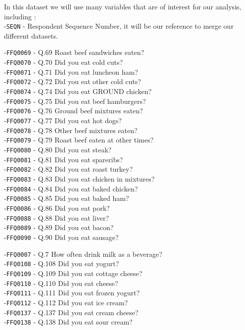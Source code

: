 \documentclass[
]{article}
\begin{document}
In this dataset we will use many variables that are of interest for our
analysis, including :\\
-\texttt{SEQN} - Respondent Sequence Number, it will be our reference to
merge our different datasets.

-\texttt{FFQ0069} - Q.69 Roast beef sandwiches eaten?\\
-\texttt{FFQ0070} - Q.70 Did you eat cold cuts?\\
-\texttt{FFQ0071} - Q.71 Did you eat luncheon ham?\\
-\texttt{FFQ0072} - Q.72 Did you eat other cold cuts?\\
-\texttt{FFQ0074} - Q.74 Did you eat GROUND chicken?\\
-\texttt{FFQ0075} - Q.75 Did you eat beef hamburgers?\\
-\texttt{FFQ0076} - Q.76 Ground beef mixtures eaten?\\
-\texttt{FFQ0077} - Q.77 Did you eat hot dogs?\\
-\texttt{FFQ0078} - Q.78 Other beef mixtures eaten?\\
-\texttt{FFQ0079} - Q.79 Roast beef eaten at other times?\\
-\texttt{FFQ0080} - Q.80 Did you eat steak?\\
-\texttt{FFQ0081} - Q.81 Did you eat spareribs?\\
-\texttt{FFQ0082} - Q.82 Did you eat roast turkey?\\
-\texttt{FFQ0083} - Q.83 Did you eat chicken in mixtures?\\
-\texttt{FFQ0084} - Q.84 Did you eat baked chicken?\\
-\texttt{FFQ0085} - Q.85 Did you eat baked ham?\\
-\texttt{FFQ0086} - Q.86 Did you eat pork?\\
-\texttt{FFQ0088} - Q.88 Did you eat liver?\\
-\texttt{FFQ0089} - Q.89 Did you eat bacon?\\
-\texttt{FFQ0090} - Q.90 Did you eat sausage?

-\texttt{FFQ0007} - Q.7 How often drink milk as a beverage?\\
-\texttt{FFQ0108} - Q.108 Did you eat yogurt?\\
-\texttt{FFQ0109} - Q.109 Did you eat cottage cheese?\\
-\texttt{FFQ0110} - Q.110 Did you eat cheese?\\
-\texttt{FFQ0111} - Q.111 Did you eat frozen yogurt?\\
-\texttt{FFQ0112} - Q.112 Did you eat ice cream?\\
-\texttt{FFQ0137} - Q.137 Did you eat cream cheese?\\
-\texttt{FFQ0138} - Q.138 Did you eat sour cream?
\end{document}
